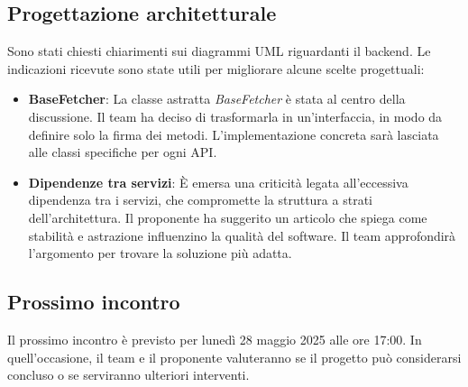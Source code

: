 \subsection{Progettazione architetturale}

Sono stati chiesti chiarimenti sui diagrammi UML riguardanti il backend. Le indicazioni ricevute sono state utili per migliorare alcune scelte progettuali:

\begin{itemize} 
    \item \textbf{BaseFetcher}: La classe astratta \textit{BaseFetcher} è stata al centro della discussione. Il team ha deciso di trasformarla in un’interfaccia, in modo da definire solo la firma dei metodi. L’implementazione concreta sarà lasciata alle classi specifiche per ogni API. 
    \item \textbf{Dipendenze tra servizi}: È emersa una criticità legata all’eccessiva dipendenza tra i servizi, che compromette la struttura a strati dell’architettura. Il proponente ha suggerito un articolo che spiega come stabilità e astrazione influenzino la qualità del software. Il team approfondirà l’argomento per trovare la soluzione più adatta. 
\end{itemize}

\subsection{Prossimo incontro}

Il prossimo incontro è previsto per lunedì 28 maggio 2025 alle ore 17:00. In quell’occasione, il team e il proponente valuteranno se il progetto può considerarsi concluso o se serviranno ulteriori interventi.